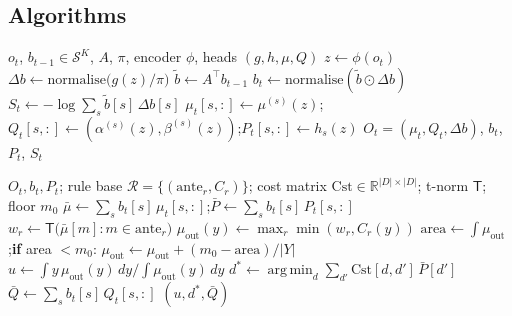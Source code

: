 \documentclass[11pt,a4paper]{article}
\numberwithin{equation}{section}
\theoremstyle{plain}
\theoremstyle{definition}
\theoremstyle{remark}
\newcommand{\R}{\mathbb{R}}
\newcommand{\simplex}{\mathcal{S}}
\DeclareMathOperator*{\argmin}{arg\,min}
\begin{document}
\subsection{Algorithms}

\begin{algorithm}[H]
\caption{BSF-S1 step (per observation; $O(K^2+KM)$ beyond the encoder)}
\begin{algorithmic}[1]
\Require $o_t$, $b_{t-1}\in\simplex^K$, $A$, $\pi$, encoder $\phi$, heads $(g,h,\mu,Q)$
\State $z\gets\phi(o_t)$
\State $\Delta b\gets\mathrm{normalise}\bigl(g(z)/\pi\bigr)$ 
\State $\tilde b\gets A^\top b_{t-1}$ 
\State $b_t\gets\mathrm{normalise}(\tilde b\odot\Delta b)$ 
\State $S_t\gets-\log\sum_s\tilde b[s]\,\Delta b[s]$ 
 
  \State $\mu_t[s,:]\gets\mu^{(s)}(z)$;\quad $Q_t[s,:]\gets(\alpha^{(s)}(z),\beta^{(s)}(z))$;\quad $P_t[s,:]\gets h_s(z)$
\EndFor
\Ensure $O_t=(\mu_t,Q_t,\Delta b)$, $b_t$, $P_t$, $S_t$
\end{algorithmic}
\end{algorithm}

\begin{algorithm}[H]
\caption{Actuator: the single collapse}
\begin{algorithmic}[1]
\Require $O_t,b_t,P_t$; rule base $\mathcal R=\{(\text{ante}_r,C_r)\}$; cost matrix $\mathrm{Cst}\in\R^{|D|\times|D|}$; t-norm $\mathsf T$; floor $m_0$
\State $\bar\mu\gets\sum_s b_t[s]\,\mu_t[s,:]$;\quad $\bar P\gets\sum_s b_t[s]\,P_t[s,:]$ 
  \State $w_r\gets\mathsf T\bigl(\bar\mu[m]:m\in\text{ante}_r\bigr)$ 
\EndFor
\State $\mu_{\mathrm{out}}(y)\gets\max_r\min(w_r,C_r(y))$ 
\State $\text{area}\gets\int\mu_{\mathrm{out}}$;\quad \textbf{if} area $<m_0$: $\mu_{\mathrm{out}}\gets\mu_{\mathrm{out}}+(m_0-\text{area})/|Y|$ 
\State $u\gets\int y\,\mu_{\mathrm{out}}(y)\,dy\big/\int\mu_{\mathrm{out}}(y)\,dy$ 
\State $d^\ast\gets\argmin_d\sum_{d'}\mathrm{Cst}[d,d']\,\bar P[d']$ 
\State $\bar Q\gets\sum_s b_t[s]\,Q_t[s,:]$ 
\Ensure $(u,d^\ast,\bar Q)$
\end{algorithmic}
\end{algorithm}
\end{document}
